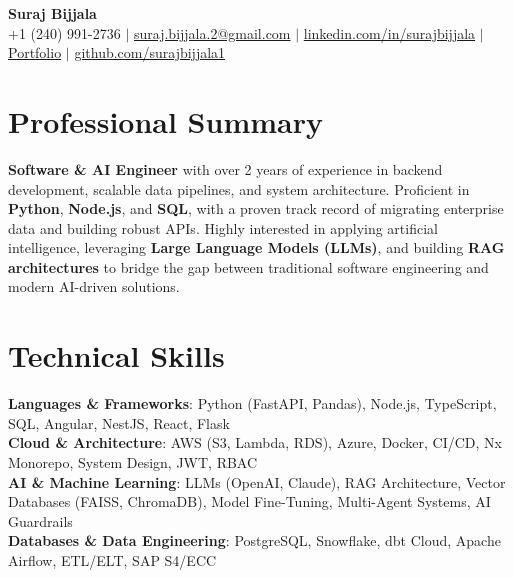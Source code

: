 \documentclass[letterpaper,11pt]{article}
\begin{document}
\begin{center}
    \textbf{ \huge Suraj Bijjala} \\ \vspace{2pt}
    \small
    +1 (240) 991-2736 $|$
    \href{mailto:suraj.bijjala.2@gmail.com}{{suraj.bijjala.2@gmail.com}} $|$
    \href{https://www.linkedin.com/in/surajbijjala}{{linkedin.com/in/surajbijjala}} $|$
    \href{https://www.datascienceportfol.io/surajbijjala}{Portfolio} $|$ \href{https://github.com/surajbijjala1}{{github.com/surajbijjala1}}
\end{center}

\vspace{-16pt}

\section{Professional Summary}
\small{
 \textbf{Software \& AI Engineer} with over 2 years of experience in backend development, scalable data pipelines, and system architecture. Proficient in \textbf{Python}, \textbf{Node.js}, and \textbf{SQL}, with a proven track record of migrating enterprise data and building robust APIs. Highly interested in applying artificial intelligence, leveraging \textbf{Large Language Models (LLMs)}, and building \textbf{RAG architectures} to bridge the gap between traditional software engineering and modern AI-driven solutions.
}
\vspace{-8pt}

\section{Technical Skills}
\small{
\linespread{1.15}\selectfont
 \textbf{Languages \& Frameworks}{: Python (FastAPI, Pandas), Node.js, TypeScript, SQL, Angular, NestJS, React, Flask} \\
 \textbf{Cloud \& Architecture}{: AWS (S3, Lambda, RDS), Azure, Docker, CI/CD, Nx Monorepo, System Design, JWT, RBAC} \\
 \textbf{AI \& Machine Learning}{: LLMs (OpenAI, Claude), RAG Architecture, Vector Databases (FAISS, ChromaDB), Model Fine-Tuning, Multi-Agent Systems, AI Guardrails} \\
 \textbf{Databases \& Data Engineering}{: PostgreSQL, Snowflake, dbt Cloud, Apache Airflow, ETL/ELT, SAP S4/ECC}
}
\vspace{-8pt}
\end{document}
